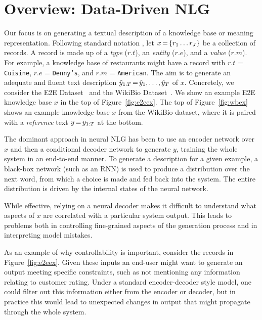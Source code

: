 \documentclass[11pt,a4paper]{article}
\begin{document}
\section{Overview: Data-Driven NLG}
Our focus is on generating a textual description of a knowledge base or 
meaning representation. Following standard notation \citep{liang2009learning,wiseman2017challenges}, let $x \, {=} \, \{r_1 \ldots r_J\}$ be a collection of records. A record is made up of a \textit{type} ($r.t$), an \textit{entity} ($r.e$), 
and a \textit{value} ($r.m$).  For example, a knowledge base of restaurants might have a record with $r.t$ = \texttt{Cuisine}, $r.e$ = \texttt{Denny's}, and $r.m$ = \texttt{American}. The aim is to generate an adequate and fluent text description $\hat{y}_{1:T} \, {=} \, \hat{y}_1, \ldots, \hat{y}_T$ of $x$. Concretely, we consider the E2E Dataset~\citep{novikova2017e2e} and the WikiBio Dataset~\citep{lebret2016neural}. We show an example E2E knowledge base $x$ in the top of Figure~\ref{fig:e2eex}. The top of Figure~\ref{fig:wbex} shows an example knowledge base $x$ from the WikiBio dataset, where it is paired with a \textit{reference} text $y \, {=} \, y_{1:T}$ at the bottom.

The dominant approach in neural NLG has been to use an encoder network over $x$ and then a conditional decoder network to generate $y$, training the whole system in an end-to-end manner. To generate a description for a given example, a black-box network (such as an RNN) is used to produce a distribution over the next word, from
which a choice is made and fed back into the system. The entire distribution is driven by the internal states of the neural network. 

While effective, relying on a neural decoder makes it difficult to understand what aspects of $x$ are correlated with a particular system output. This leads to problems both in controlling fine-grained aspects of the generation process and in interpreting model mistakes. 

As an example of why controllability is important, consider the records in Figure~\ref{fig:e2eex}. Given these inputs  an end-user might want to generate an output meeting specific constraints, such as not mentioning any information relating to customer rating. Under a standard encoder-decoder style model, one could filter out this information 
either from the encoder or decoder, but in practice this would lead to unexpected changes in output that 
might propagate through the whole system.
\end{document}
